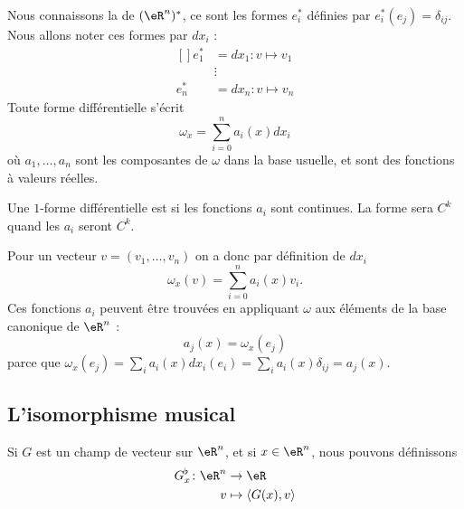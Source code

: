 Nous connaissons la  de $(\eR^n)^*$, ce sont les formes $e^*_i$ définies par $e^*_i(e_j)=\delta_{ij}$. Nous allons noter ces formes par $dx_i$ :
\begin{equation}        \label{EQooITHKooDzigPY}
	\begin{aligned}[]
		e^*_1&=dx_1\colon v\mapsto v_1	\\
			&\vdots			\\
		e^*_n&=dx_n\colon v\mapsto v_n
	\end{aligned}
\end{equation}
Toute forme différentielle s'écrit
\begin{equation}
  \omega_x = \sum_{i=0}^n a_i(x) d x_i
\end{equation}
où $a_1,\ldots,a_n$ sont les composantes de $\omega$ dans la base usuelle, et sont des fonctions à valeurs réelles.

\begin{lemma}
    Une $1$-forme différentielle est  si les fonctions $a_i$ sont continues. La forme sera $C^k$ quand les $a_i$ seront $C^k$.
\end{lemma}

Pour un vecteur $v = (v_1,\ldots,v_n)$ on a donc par définition de $d x_i$
\begin{equation}
  \omega_x (v) = \sum_{i=0}^n a_i(x) v_i.
\end{equation}
Ces fonctions $a_i$ peuvent être trouvées en appliquant $\omega$ aux éléments de la base canonique de $\eR^n$ :
\begin{equation}
	a_j(x)=\omega_x(e_j)
\end{equation}
parce que $\omega_x(e_j)=\sum_ia_i(x)dx_i(e_i)=\sum_ia_i(x)\delta_{ij}=a_j(x)$.

\subsection{L'isomorphisme musical}

Si $G$ est un champ de vecteur sur $\eR^n$, et si $x\in\eR^n$, nous pouvons définissons 
\begin{equation}		\label{EqDefBemol}
	\begin{aligned}[]
		G^{\flat}_x\colon \eR^n&\to \eR \\
			v&\mapsto \langle G(x), v\rangle 
	\end{aligned}
\end{equation}


